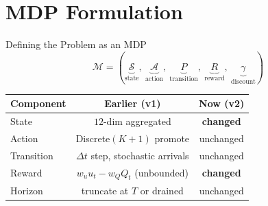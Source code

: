 


\section{MDP Formulation}

\begin{frame}{Defining the Problem as an MDP}
  $$ \mathcal{M} = (\underbrace{\mathcal{S}}_{\text{state}},\ \underbrace{\mathcal{A}}_{\text{action}},\ \underbrace{P}_{\text{transition}},\ \underbrace{R}_{\text{reward}},\ \underbrace{\gamma}_{\text{discount}}) $$

  \vspace{0.6em}
  \begin{center}
  \renewcommand{\arraystretch}{1.25}
  \begin{tabular}{l c c}
    \toprule
    \textbf{Component} & \textbf{Earlier (v1)} & \textbf{Now (v2)} \\
    \midrule
    State      & $12$-dim aggregated   & \textcolor{SoftCoral}{\textbf{changed}} \\
    Action     & Discrete$(K{+}1)$ promote         & unchanged \\
    Transition & $\Delta t$ step, stochastic arrivals & unchanged \\
    Reward     & $w_u u_t - w_Q Q_t$ (unbounded)   & \textcolor{SoftCoral}{\textbf{changed}} \\
    Horizon    & truncate at $T$ or drained        & unchanged \\
    \bottomrule
  \end{tabular}
  \end{center}

  \vspace{0.3em}
  \centering
\end{frame}

